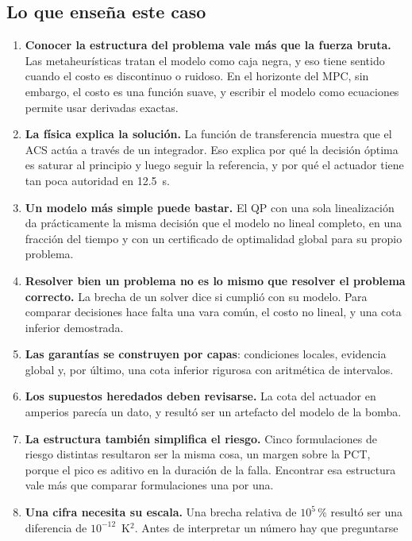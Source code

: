 \subsection{Lo que enseña este caso}
\begin{enumerate}
  \item \textbf{Conocer la estructura del problema vale más que la fuerza bruta.} Las
        metaheurísticas tratan el modelo como caja negra, y eso tiene sentido cuando el costo es
        discontinuo o ruidoso. En el horizonte del MPC, sin embargo, el costo es una función
        suave, y escribir el modelo como ecuaciones permite usar derivadas exactas.
  \item \textbf{La física explica la solución.} La función de transferencia muestra que el ACS
        actúa a través de un integrador. Eso explica por qué la decisión óptima es saturar al
        principio y luego seguir la referencia, y por qué el actuador tiene tan poca autoridad
        en 12.5~s.
  \item \textbf{Un modelo más simple puede bastar.} El QP con una sola linealización da
        prácticamente la misma decisión que el modelo no lineal completo, en una fracción del
        tiempo y con un certificado de optimalidad global para su propio problema.
  \item \textbf{Resolver bien un problema no es lo mismo que resolver el problema correcto.}
        La brecha de un solver dice si cumplió con su modelo. Para comparar decisiones hace
        falta una vara común, el costo no lineal, y una cota inferior demostrada.
  \item \textbf{Las garantías se construyen por capas}: condiciones locales, evidencia global
        y, por último, una cota inferior rigurosa con aritmética de intervalos.
  \item \textbf{Los supuestos heredados deben revisarse.} La cota del actuador en amperios
        parecía un dato, y resultó ser un artefacto del modelo de la bomba.
  \item \textbf{La estructura también simplifica el riesgo.} Cinco formulaciones de riesgo
        distintas resultaron ser la misma cosa, un margen sobre la PCT, porque el pico es
        aditivo en la duración de la falla. Encontrar esa estructura vale más que comparar
        formulaciones una por una.
  \item \textbf{Una cifra necesita su escala.} Una brecha relativa de $10^5$\,\% resultó ser
        una diferencia de $10^{-12}$~K$^2$. Antes de interpretar un número hay que preguntarse

\end{enumerate}
